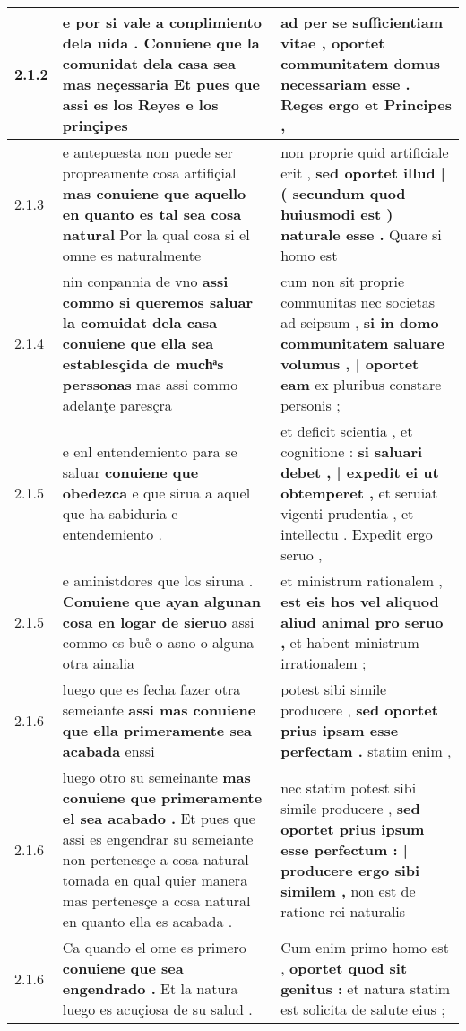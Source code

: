 \begin{tabular}{|p{1cm}|p{6.5cm}|p{6.5cm}|}
2.1.2 & e por si vale a conplimiento dela uida . \textbf{ Conuiene que la comunidat dela casa sea mas neçessaria } Et pues que assi es los Reyes e los prinçipes & ad per se sufficientiam vitae , \textbf{ oportet communitatem domus necessariam esse . } Reges ergo et Principes , \\\hline
2.1.3 & e antepuesta non puede ser propreamente cosa artifiçial \textbf{ mas conuiene que aquello en quanto es tal sea cosa natural } Por la qual cosa si el omne es naturalmente & non proprie quid artificiale erit , \textbf{ sed oportet illud | ( secundum quod huiusmodi est ) naturale esse . } Quare si homo est \\\hline
2.1.4 & nin conpannia de vno \textbf{ assi commo si queremos saluar la comuidat dela casa conuiene que ella sea establesçida de muchͣs perssonas } mas assi commo adelanţe paresçra & cum non sit proprie communitas nec societas ad seipsum , \textbf{ si in domo communitatem saluare volumus , | oportet eam } ex pluribus constare personis ; \\\hline
2.1.5 & e enl entendemiento para se saluar \textbf{ conuiene que obedezca } e que sirua a aquel que ha sabiduria e entendemiento . & et deficit scientia , et cognitione : \textbf{ si saluari debet , | expedit ei ut obtemperet , } et seruiat vigenti prudentia , et intellectu . Expedit ergo seruo , \\\hline
2.1.5 & e aministdores que los siruna . \textbf{ Conuiene que ayan algunan cosa en logar de sieruo } assi commo es bue̊ o asno o alguna otra ainalia & et ministrum rationalem , \textbf{ est eis hos vel aliquod aliud animal pro seruo , } et habent ministrum irrationalem ; \\\hline
2.1.6 & luego que es fecha fazer otra semeiante \textbf{ assi mas conuiene que ella primeramente sea acabada } enssi & potest sibi simile producere , \textbf{ sed oportet prius ipsam esse perfectam . } statim enim , \\\hline
2.1.6 & luego otro su semeinante \textbf{ mas conuiene que primeramente el sea acabado . } Et pues que assi es engendrar su semeiante non pertenesçe a cosa natural tomada en qual quier manera mas pertenesçe a cosa natural en quanto ella es acabada . & nec statim potest sibi simile producere , \textbf{ sed oportet prius ipsum esse perfectum : | producere ergo sibi similem , } non est de ratione rei naturalis \\\hline
2.1.6 & Ca quando el ome es primero \textbf{ conuiene que sea engendrado . } Et la natura luego es acuçiosa de su salud . & Cum enim primo homo est , \textbf{ oportet quod sit genitus : } et natura statim est solicita de salute eius ; \\\hline

\end{tabular}
